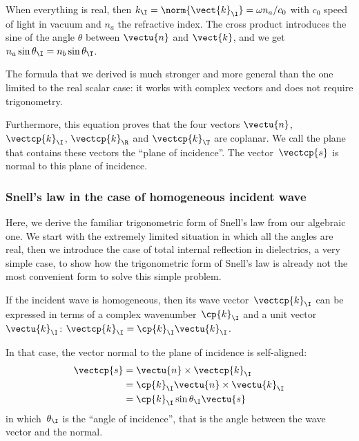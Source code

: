 \begin{refsection}
When everything is real, then $k_\I=\norm{\vect{k}_\I}=\omega n_a / c_0$ with $c_0$ speed of light in vacuum and $n_a$ the refractive index.
The cross product introduces the sine of the angle $\theta$ between $\vectu{n}$ and $\vect{k}$, and we get
$n_a \sin{\theta_\I} = n_b \sin{\theta_\T}$.

The formula that we derived is much stronger and more general than the one limited to the real scalar case: it works with complex vectors and does not require trigonometry.

Furthermore, this equation proves that the four vectors $\vectu{n}$, $\vectcp{k}_\I$, $\vectcp{k}_\R$ and $\vectcp{k}_\T$ are coplanar.
We call the plane that contains these vectors the ``plane of incidence''.
The vector~$\vectcp{s}$ is normal to this plane of incidence.

\subsubsection{Snell's law in the case of homogeneous incident wave}
Here, we derive the familiar trigonometric form of Snell's law from our algebraic one.
We start with the extremely limited situation in which all the angles are real, then we introduce the case of total internal reflection in dielectrics, a very simple case, to show how the trigonometric form of Snell's law is already not the most convenient form to solve this simple problem.

If the incident wave is homogeneous, then its
wave vector~$\vectcp{k}_\I$ can be expressed in terms of a complex wavenumber~$\cp{k}_\I$ and a unit vector~$\vectu{k}_\I$: $\vectcp{k}_\I = \cp{k}_\I \vectu{k}_\I$.

In that case, the vector normal to the plane of incidence is self-aligned:
\begin{subequations}
    \begin{align}
        \vectcp{s}
        &=
        \vectu{n} \times \vectcp{k}_\I
        \\
        &= \cp{k}_\I \vectu{n} \times \vectu{k}_\I
        \\
        &= \cp{k}_\I \sin \theta_\I \vectu{s}
    \end{align}
\end{subequations}
in which~$\theta_\I$ is the ``angle of incidence'', that is the angle between the wave vector and the normal.


\end{refsection}
